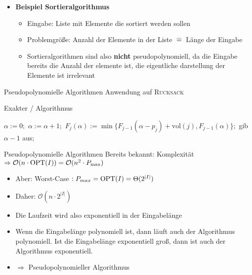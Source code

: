 \begin{frame}
    \begin{itemize}
    	\item \textbf{Beispiel Sortieralgorithmus}
        \begin{itemize}
            \item Eingabe: Liste mit Elemente die sortiert werden sollen
            \item Problemgröße: Anzahl der Elemente in der Liste $\widehat{=}$ Länge der Eingabe
            \item	Sortieralgorithmen sind also \textbf{nicht} pseudopolynomiell, da die Eingabe bereits die Anzahl der elemente ist, die eigentliche darstellung der Elemente ist irrelevant
        \end{itemize}
    \end{itemize}
\end{frame}

\begin{frame}{Pseudopolynomielle Algorithmen}
Anwendung auf \textsc{Rucksack}
\newline

\begin{algorithm}[H]
    \caption{Exakter \rucksack/ Algorithmus}
        \begin{algorithmic}
            \State $\alpha:=0;$
            \Repeat
            \State $\alpha:=\alpha+1;$
            \State $F_j(\alpha):=\min\{F_{j-1}(\alpha-p_j)+\text{vol}(j),F_{j-1}(\alpha)\};$
            \EndFor
            \State gib $\alpha-1$ aus$;$
        \end{algorithmic}
\end{algorithm}

\end{frame}

\begin{frame}{Pseudopolynomielle Algorithmen}
Bereits bekannt: Komplexität $\Rightarrow \mathcal{O}( n \cdot \operatorname{OPT}(I)) = \mathcal{O}( n^2 \cdot P_{\max})$ 
\begin{itemize}
	\item
	Aber: Worst-Case $: P_{max} = \operatorname{OPT}(I) = \Theta(2^{|I|})$
	\item
	Daher: 
	$\mathcal{O}(n\cdot 2^{|I|})$
	\item
	Die Laufzeit wird also exponentiell in der Eingabelänge
	\item
	Wenn die Eingabelänge polynomiell ist, dann läuft auch der Algorithmus polynomiell. Ist die Eingabelänge exponentiell groß, dann ist auch der Algorithmus exponentiell.
	\item $\Rightarrow$ Pseudopolynomieller Algorithmus
\end{itemize}

\end{frame}

